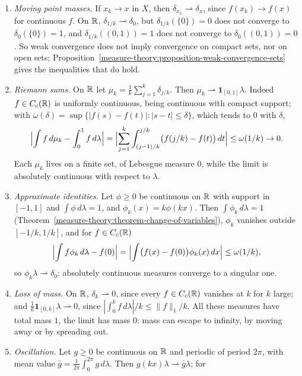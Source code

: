 \begin{example}\label{measure-theory:example-weak-convergence}
\begin{enumerate}
\item \emph{Moving point masses.} If $x_k \to x$ in $X$, then $\delta_{x_k} \rightharpoonup \delta_x$, since $f(x_k) \to f(x)$ for continuous $f$. On $\mathbb{R}$, $\delta_{1/k} \rightharpoonup \delta_0$, but
$\delta_{1/k}(\{0\}) = 0$ does not converge to $\delta_0(\{0\}) = 1$, and $\delta_{1/k}((0, 1)) = 1$ does not converge to $\delta_0((0, 1)) = 0$. So weak convergence does not imply convergence on
compact sets, nor on open sets; Proposition~\ref{measure-theory:proposition-weak-convergence-sets} gives the inequalities that do hold.
\item \emph{Riemann sums.} On $\mathbb{R}$ let $\mu_k = \frac1k\sum_{j=1}^k\delta_{j/k}$. Then $\mu_k \rightharpoonup \mathbf{1}_{[0, 1]}\lambda$. Indeed $f \in C_c(\mathbb{R})$ is uniformly continuous, being
continuous with compact support; with $\omega(\delta) = \sup\{|f(s) - f(t)| : |s - t| \leq \delta\}$, which tends to $0$ with $\delta$,
\[
\Bigl|\int f\,d\mu_k - \int_0^1f\,d\lambda\Bigr| = \Bigl|\sum_{j=1}^k\int_{(j-1)/k}^{j/k}\bigl(f(j/k) - f(t)\bigr)\,dt\Bigr| \leq \omega(1/k) \to 0.
\]
Each $\mu_k$ lives on a finite set, of Lebesgue measure $0$, while the limit is absolutely continuous with respect to $\lambda$.
\item \emph{Approximate identities.} Let $\phi \geq 0$ be continuous on $\mathbb{R}$ with support in $[-1, 1]$ and $\int\phi\,d\lambda = 1$, and $\phi_k(x) = k\phi(kx)$. Then $\int\phi_k\,d\lambda = 1$
(Theorem~\ref{measure-theory:theorem-change-of-variables}), $\phi_k$ vanishes outside $[-1/k, 1/k]$, and for $f \in C_c(\mathbb{R})$
\[
\Bigl|\int f\phi_k\,d\lambda - f(0)\Bigr| = \Bigl|\int\bigl(f(x) - f(0)\bigr)\phi_k(x)\,dx\Bigr| \leq \omega(1/k),
\]
so $\phi_k\lambda \rightharpoonup \delta_0$: absolutely continuous measures converge to a singular one.
\item \emph{Loss of mass.} On $\mathbb{R}$, $\delta_k \rightharpoonup 0$, since every $f \in C_c(\mathbb{R})$ vanishes at $k$ for $k$ large; and $\frac1k\mathbf{1}_{[0, k]}\lambda \rightharpoonup 0$, since
$|\int_0^kf\,d\lambda|/k \leq \|f\|_1/k$. All these measures have total mass $1$, the limit has mass $0$: mass can escape to infinity, by moving away or by spreading out.
\item \emph{Oscillation.} Let $g \geq 0$ be continuous on $\mathbb{R}$ and periodic of period $2\pi$, with mean value $\bar g = \frac1{2\pi}\int_0^{2\pi}g\,d\lambda$. Then $g(kx)\lambda \rightharpoonup \bar g\lambda$; for

\end{enumerate}
\end{example}
